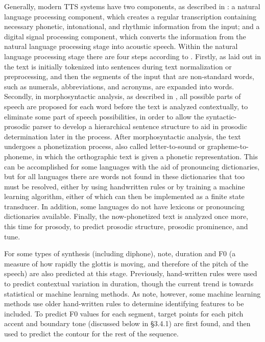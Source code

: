 \documentclass[12pt]{article}
\begin{document}
	Generally, modern TTS systems have two components, as described in \citet{ox-handbook}: a natural language processing component, which creates a regular transcription containing necessary phonetic, intonational, and rhythmic information from the input; and a digital signal processing component, which converts the information from the natural language processing stage into acoustic speech. Within the natural language processing stage there are four steps according to \citet{ox-handbook}. Firstly, as laid out in \citet{slp} the text is initially tokenized into sentences during text normalization or preprocessing, and then the segments of the input that are non-standard words, such as numerals, abbreviations, and acronyms, are  expanded into words. Secondly, in morphosyntactic analysis, as described in \citet{ox-handbook}, all possible parts of speech are proposed for each word before the text is analyzed contextually, to eliminate some part of speech possibilities, in order to allow the syntactic-prosodic parser to develop a hierarchical sentence structure to aid in prosodic determination later in the process. After morphosyntactic analysis, the text undergoes a phonetization process, also called letter-to-sound or grapheme-to-phoneme, in which the orthographic text is given a phonetic representation. This can be accomplished for some languages with the aid of pronouncing dictionaries, but for all languages there are words not found in these dictionaries that too must be resolved, either by using handwritten rules or by training a machine learning algorithm, either of which can then be implemented as a finite state transducer. In addition, some languages do not have lexicons or pronouncing dictionaries available. Finally, the now-phonetized text is analyzed once more, this time for prosody, to predict prosodic structure, prosodic prominence, and tune. \par

	For some types of synthesis (including diphone), \citet{slp} note, duration and F0 (a measure of how rapidly the glottis is moving, and therefore of the pitch of the speech) are also predicted at this stage. Previously, hand-written rules were used to predict contextual variation in duration, though the current trend is towards statistical or machine learning methods. As \citet{slp} note, however, some machine learning methods use older hand-written rules to determine identifying features to be included. To predict F0 values for each segment, target points for each pitch accent and boundary tone (discussed below in \S 3.4.1) are first found, and then used to predict the contour for the rest of the sequence. \par
\end{document}
